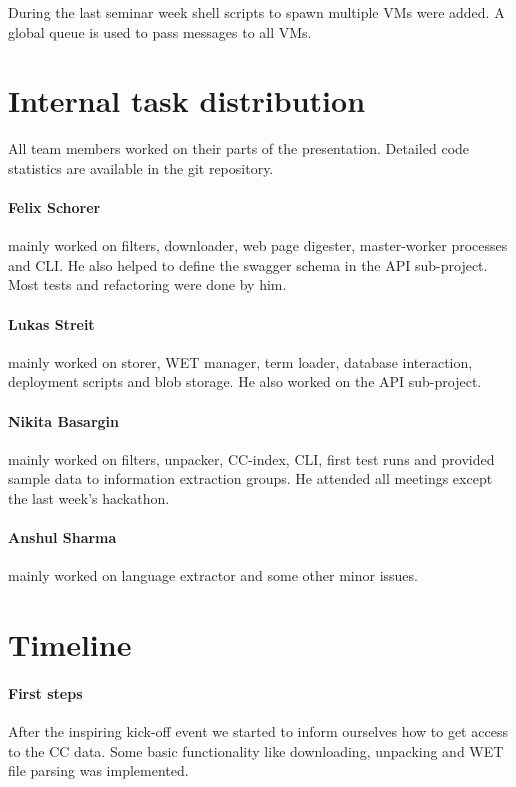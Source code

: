 \documentclass[DIV=calc, paper=a4, fontsize=11pt, twocolumn]{scrartcl}
\begin{document}
During the last seminar week shell scripts to spawn multiple VMs were added. A global queue is used to pass messages to all VMs.


\section*{Internal task distribution}
All team members worked on their parts of the presentation. 
Detailed code statistics are available in the git repository. 


\paragraph{Felix Schorer} mainly worked on filters, downloader, web page digester, master-worker processes and CLI. 
He also helped to define the swagger schema in the API sub-project. 
Most tests and refactoring were done by him.

\paragraph{Lukas Streit} mainly worked on storer, WET manager, term loader, database interaction, deployment scripts and blob storage. 
He also worked on the API sub-project.

\paragraph{Nikita Basargin} mainly worked on filters, unpacker, CC-index, CLI, first test runs and provided sample data to information extraction groups. 
He attended all meetings except the last week's hackathon.

\paragraph{Anshul Sharma} mainly worked on language extractor and some other minor issues.




\section*{Timeline}
\paragraph{First steps}
After the inspiring kick-off event we started to inform ourselves how to get access to the CC data. 
Some basic functionality like downloading, unpacking and WET file parsing was implemented.
\end{document}
